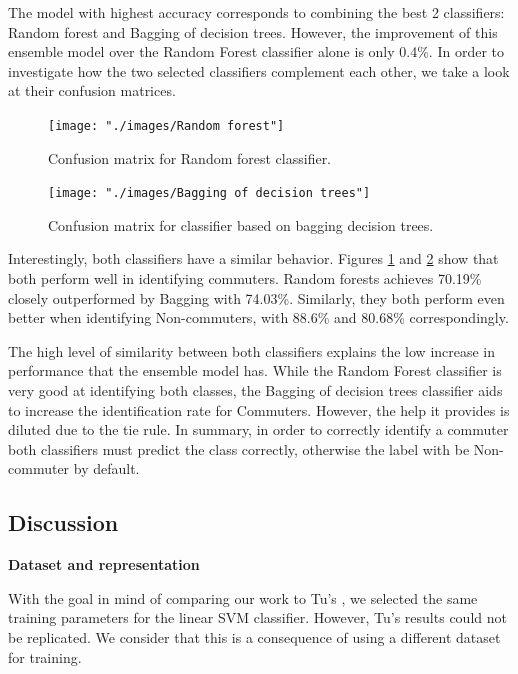 \documentclass{article}
\begin{document}
The model with highest accuracy corresponds to combining the best 2 classifiers: Random forest and Bagging of decision trees. However, the improvement of this ensemble model over the Random Forest classifier alone is only 0.4\%. In order to investigate how the two selected classifiers complement each other, we take a look at their confusion matrices. 

\begin{figure}[H]
  \centering
  \texttt{[image: "./images/Random forest"]}
  \caption{Confusion matrix for Random forest classifier.}
  \label{fig:classification/rf_confusion}
\end{figure}


\begin{figure}[H]
  \centering
  \texttt{[image: "./images/Bagging of decision trees"]}
  \caption{Confusion matrix for classifier based on bagging decision trees.}
  \label{fig:classification/bag_confusion}
\end{figure}

Interestingly, both classifiers have a similar behavior. Figures \ref{fig:classification/rf_confusion} and \ref{fig:classification/bag_confusion} show that both perform well in identifying commuters. Random forests achieves 70.19\% closely outperformed by Bagging with 74.03\%. Similarly, they both perform even better when identifying Non-commuters, with 88.6\% and 80.68\% correspondingly. 

The high level of similarity between both classifiers explains the low increase in performance that the ensemble model has. While the Random Forest classifier is very good at identifying both classes, the Bagging of decision trees classifier aids to increase the identification rate for Commuters. However, the help it provides is diluted due to the tie rule. In summary, in order to correctly identify a commuter both classifiers must predict the class correctly, otherwise the label with be Non-commuter by default.

\subsection{Discussion}

\textbf{Dataset and representation}


With the goal in mind of comparing our work to Tu's \cite{tu2016impact}, we selected the same training parameters for the linear SVM classifier. However, Tu's results could not be replicated. We consider that this is a consequence of using a different dataset for training. 
\end{document}

